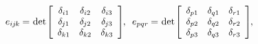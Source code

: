 \nopagebreak\vspace{-0.2em}
\begin{equation*}
e_{i\hspace{-0.1ex}j\hspace{-0.1ex}k} \hspace{-0.1ex} = \hspace{.1ex}
\determinant\hspace{-0.25ex} \scalebox{0.96}[0.96]{$\left[\begin{array}{ccc}
\delta_{i1} & \delta_{i2} & \delta_{i3} \\
\delta_{\hspace{-0.1ex}j1} & \delta_{\hspace{-0.1ex}j2} & \delta_{\hspace{-0.1ex}j3} \\
\delta_{k1} & \delta_{k2} & \delta_{k3}
\end{array}\right]$}
\hspace{-0.2ex} , \hspace{.5em}
%
e_{pqr} \hspace{-0.1ex} = \hspace{.1ex}
\determinant\hspace{-0.25ex} \scalebox{0.96}[0.96]{$\left[\begin{array}{ccc}
\delta_{p1} & \delta_{q1} & \delta_{r1} \\
\delta_{p2} & \delta_{q2} & \delta_{r2} \\
\delta_{p3} & \delta_{q3} & \delta_{r3}
\end{array}\right]$}
\hspace{-0.2ex} ,
\end{equation*}

